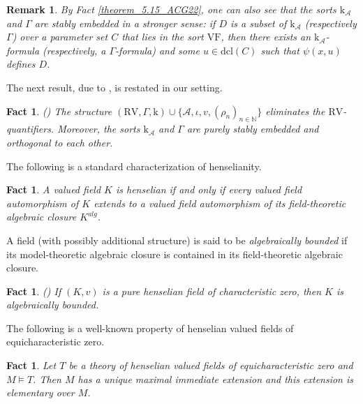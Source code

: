 \documentclass[12pt]{article}
\newcommand{\dcl}{\mathrm{dcl}}
\newcommand{\rv}{\mathrm{RV}}
\newcommand{\val}{\textit{v}}
\newcommand{\0}{\emptyset}
\newcommand{\vf}{\mathrm{VF}}
\newcommand{\rf}{\mathrm{k}}
\newcommand{\A}{\mathcal{A}}
\newcommand{\U}{\mathcal{U}}
\newcommand{\Ualg}{\mathcal{U}_0}
\theoremstyle{plain}%
\newtheorem{rem}[thm]{Remark}
\newtheorem{fact}[thm]{Fact}
\theoremstyle{definition}
\theoremstyle{remark}
\begin{document}
\begin{rem}\label{stabembedded_with_control_of_parameters}
By Fact \ref{theorem_5.15_ACG22}, one can also see that the sorts $\rf_{\A}$ and $\Gamma$ are stably embedded in a stronger sense: if $D$ is a subset of $\rf_{\A}$ (respectively $\Gamma$) over a parameter set $C$ that lies in the sort $\vf$, then there exists an $\rf_{\A}$-formula (respectively, a $\Gamma$-formula) and some $u\in \dcl(C)$ such that $\psi(x, u)$ defines $D$.
\end{rem}

The next result, due to \cite{ACG22}, is restated in our setting.
\begin{fact}\label{QE_RV}(\cite[Corollary 4.8]{ACG22})  The structure $(\rv, \Gamma, \rf)\cup \{\A, \iota, \val, (\rho_{n})_{n\in\mathbb{N}} \}$ eliminates the $\rv$-quantifiers. Moreover, the sorts $\rf_{\A}$ and $\Gamma$ are purely stably embedded and orthogonal to each other. \end{fact}

The following is a standard characterization of henselianity. %

\begin{fact}\label{henselianity} A valued field $K$ is henselian if and only if every valued field automorphism of $K$ extends to a valued field automorphism of its field-theoretic algebraic closure $K^{alg}$.
\end{fact}

A field (with possibly additional structure) is said to be \textit{algebraically bounded} if its model-theoretic algebraic closure is contained in its field-theoretic algebraic closure.

\begin{fact}\label{algebraically_bounded}(\cite{vdD89})
If $(K,v)$ is a pure henselian field of characteristic zero, then $K$ is algebraically bounded.
\end{fact}
The following is a well-known property of henselian valued fields of equicharacteristic zero.
\begin{fact}\label{maximal_immediate_model} Let $T$ be a theory of henselian valued fields of equicharacteristic zero and $M\models T$. Then $M$ has a unique maximal immediate extension and this extension is elementary over $M$. 
\end{fact}
\end{document}

